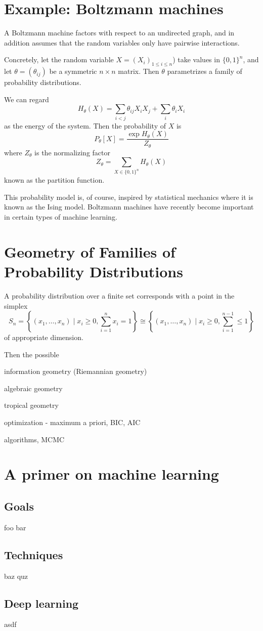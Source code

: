 \documentclass[11pt]{article}
\begin{document}
\section{Example: Boltzmann machines}

A Boltzmann machine factors with respect to an undirected graph, and in addition
assumes that the random variables only have pairwise interactions.

Concretely, let the random variable $X = (X_i)_{1 \le i \le n}$) take values in
$\{0,1\}^n$, and let $\theta = (\theta_{ij})$ be a symmetric $n \times n$ matrix.
Then $\theta$ parametrizes a family of probability distributions.

We can regard 
\[
    H_\theta(X) = \sum_{i < j} \theta_{ij} X_i X_j + \sum_i \theta_i X_i
\]
as the energy of the system.  Then the probability of $X$ is
\[
    P_\theta[X] = \frac{\exp H_\theta(X)}{Z_\theta}
\]
where $Z_\theta$ is the normalizing factor
\[
    Z_\theta = \sum_{X \in \{0,1\}^n} H_\theta(X)
\]
known as the partition function.

This probability model is, of course, inspired by statistical mechanics where it
is known as the Ising model.  Boltzmann machines have recently become important
in certain types of machine learning.


\section{Geometry of Families of Probability Distributions}

A probability distribution over a finite set corresponds with a point in the
simplex 
\[
    S_n = 
    \left\{(x_1, \ldots, x_{n}) \mid x_i \ge 0, \sum_{i=1}^n x_i= 1\right\} 
    \cong 
    \left\{(x_1, \ldots, x_n) \mid x_i \ge 0, \sum_{i=1}^{n-1} \le 1\right\}
\]
of appropriate dimension.

Then the possible

information geometry (Riemannian geometry)

algebraic geometry

tropical geometry

optimization - maximum a priori, BIC, AIC

algorithms, MCMC


\section{A primer on machine learning}
\subsection{Goals}
foo bar
\subsection{Techniques}
baz quz
\subsection{Deep learning}
asdf 
\end{document}
